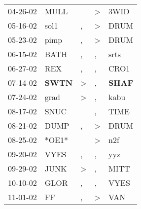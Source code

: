 \begin{supertabular}{p{0.07\textwidth}p{0.06\textwidth}p{0.02\textwidth}p{0.02\textwidth}p{0.06\textwidth}}
          04-26-02\textsuperscript{} &           MULL\textsuperscript{} &                  &     \textgreater &           3WID\textsuperscript{} \\
          05-16-02\textsuperscript{} &           sol1\textsuperscript{} &                , &     \textgreater &           DRUM\textsuperscript{} \\
          05-23-02\textsuperscript{} &           pimp\textsuperscript{} &                , &     \textgreater &           DRUM\textsuperscript{} \\
          06-15-02\textsuperscript{} &           BATH\textsuperscript{} &                , &                , &           srts\textsuperscript{} \\
          06-27-02\textsuperscript{} &            REX\textsuperscript{} &                , &                , &           CRO1\textsuperscript{} \\
          07-14-02\textsuperscript{} &  \textbf{SWTN\textsuperscript{}} &     \textgreater &                , &  \textbf{SHAF\textsuperscript{}} \\
          07-24-02\textsuperscript{} &           grad\textsuperscript{} &     \textgreater &                , &           kabu\textsuperscript{} \\
          08-17-02\textsuperscript{} &           SNUC\textsuperscript{} &                  &                , &           TIME\textsuperscript{} \\
          08-21-02\textsuperscript{} &           DUMP\textsuperscript{} &                , &     \textgreater &           DRUM\textsuperscript{} \\
          08-25-02\textsuperscript{} &                            *OE1* &                  &     \textgreater &            n2f\textsuperscript{} \\
          09-20-02\textsuperscript{} &           VYES\textsuperscript{} &                , &                , &            yyz\textsuperscript{} \\
          09-29-02\textsuperscript{} &           JUNK\textsuperscript{} &     \textgreater &                , &           MITT\textsuperscript{} \\
          10-10-02\textsuperscript{} &           GLOR\textsuperscript{} &                , &                , &           VYES\textsuperscript{} \\
          11-01-02\textsuperscript{} &             FF\textsuperscript{} &                , &     \textgreater &            VAN\textsuperscript{} \\

\end{supertabular}
